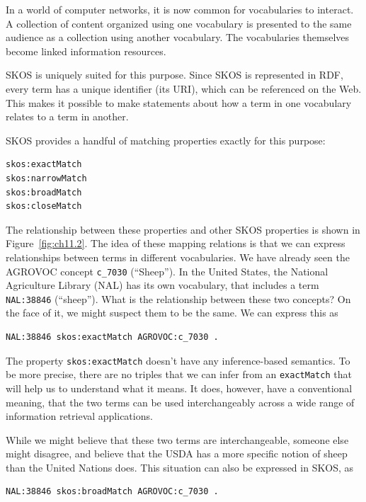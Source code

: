 In a world of computer networks, it is now common for vocabularies to
interact. A collection of content organized using one vocabulary is
presented to the same audience as a collection using another vocabulary.
The vocabularies themselves become linked information resources.

SKOS is uniquely suited for this purpose. Since SKOS is represented in
RDF, every term has a unique identifier (its URI), which can be
referenced on the Web. This makes it possible to make statements about
how a term in one vocabulary relates to a term in another.

SKOS provides a handful of matching properties exactly for this purpose:

\begin{lstlisting}
skos:exactMatch
skos:narrowMatch 
skos:broadMatch 
skos:closeMatch
\end{lstlisting}

The relationship between these properties and other SKOS properties is
shown in Figure~\ref{fig:ch11.2}. The idea of these mapping relations is that we can
express relationships between terms in different
vocabularies. We have already seen the AGROVOC concept \texttt{c\_7030}
(``Sheep''). In the United States, the National Agriculture Library
(NAL) has its own vocabulary, that includes a term \texttt{NAL:38846}
(``sheep''). What is the relationship between these two concepts? On the
face of it, we might suspect them to be the same. We can express this as

\begin{lstlisting}
NAL:38846 skos:exactMatch AGROVOC:c_7030 .
\end{lstlisting}

The property \texttt{skos:exactMatch} doesn't have any inference-based semantics.
To be more precise, there are no triples that we can infer from an
\texttt{exactMatch} that will help us to understand what it means. It does,
however, have a conventional meaning, that the two terms can be used
interchangeably across a wide range of information retrieval
applications.

While we might believe that these two terms are interchangeable, someone
else might disagree, and believe that the USDA has a more specific
notion of sheep than the United Nations does. This situation can also be
expressed in SKOS, as

\begin{lstlisting}
NAL:38846 skos:broadMatch AGROVOC:c_7030 .
\end{lstlisting}

